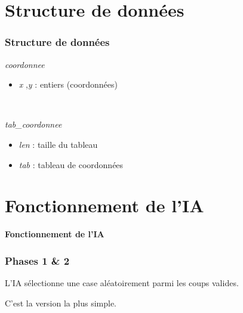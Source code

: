 \documentclass[9pt]{beamer}
\begin{document}
\section{Structure de données}
\begin{frame}
  \frametitle{Structure de données}
  \textit{coordonnee}
  \begin{itemize}
    \item \textit{x} ,\textit{y} : entiers (coordonnées)
  \end{itemize}

~

  \textit{tab\_coordonnee}
  \begin{itemize}
    \item \textit{len} : taille du tableau
    \item \textit{tab} : tableau de coordonnées
  \end{itemize}
\end{frame}

\section{Fonctionnement de l'IA}
\begin{frame}
  \begin{center}
      \Large \textbf{Fonctionnement de l'IA}
  \end{center}
\end{frame}

\begin{frame}
  \frametitle{Phases 1 \& 2}
  L’IA sélectionne une case aléatoirement parmi les coups valides.

  C’est la version la plus simple.
\end{frame}
\end{document}
